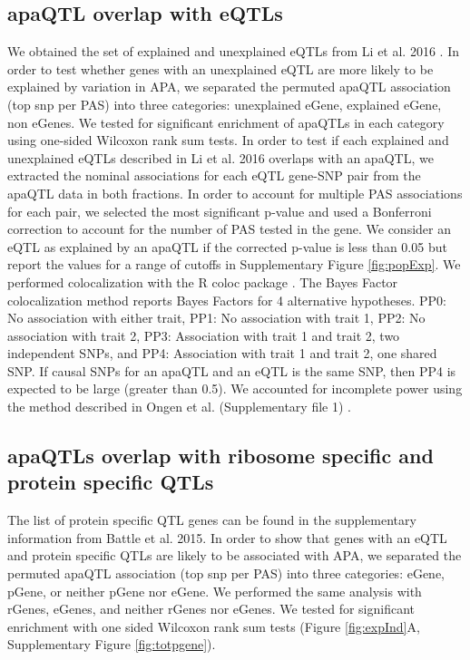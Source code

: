 \subsection{apaQTL overlap with eQTLs}\label{apaQTL-overlap-with-eQTLs}
We obtained the set of explained and unexplained eQTLs from Li et al. 2016 \citep{li_rna_2016}. In order to test whether genes with an unexplained eQTL are more likely to be explained by variation in APA, we separated the permuted apaQTL association (top snp per PAS) into three categories: unexplained eGene, explained eGene, non eGenes. We tested for significant enrichment of apaQTLs in each category using one-sided Wilcoxon rank sum tests. In order to test if each explained and unexplained eQTLs described in Li et al. 2016\citep{li_rna_2016} overlaps with an apaQTL, we extracted the nominal associations for each eQTL gene-SNP pair from the apaQTL data in both fractions. In order to account for multiple PAS associations for each pair, we selected the most significant p-value and used a Bonferroni correction to account for the number of PAS tested in the gene. We consider an eQTL as explained by an apaQTL if the corrected p-value is less than 0.05 but report the values for a range of cutoffs in Supplementary Figure \ref{fig:popExp}. We performed colocalization with the R coloc package \citep{wallace_statistical_2012}. The Bayes Factor colocalization method reports Bayes Factors for 4 alternative hypotheses. PP0: No association with either trait, PP1: No association with trait 1, PP2: No association with trait 2, PP3: Association with trait 1 and trait 2, two independent SNPs, and PP4: Association with trait 1 and trait 2, one shared SNP. If causal SNPs for an apaQTL and an eQTL is the same SNP, then PP4 is expected to be large (greater than 0.5). We accounted for incomplete power using the method described in Ongen et al. (Supplementary file 1) \citep{ongen_estimating_2017}.


\subsection{apaQTLs overlap with ribosome specific and protein specific QTLs}\label{apaQTLs-ribosome-specific-protein-specific-QTLs}
The list of protein specific QTL genes can be found in the supplementary information from Battle et al. 2015\citep{battle_genomic_2015}. In order to show that genes with an eQTL and protein specific QTLs are likely to be associated with APA, we separated the permuted apaQTL association (top snp per PAS) into three categories: eGene, pGene, or neither pGene nor eGene. We performed the same analysis with rGenes, eGenes, and neither rGenes nor eGenes. We tested for significant enrichment with one sided Wilcoxon rank sum tests (Figure \ref{fig:expInd}A, Supplementary Figure \ref{fig:totpgene}). 


